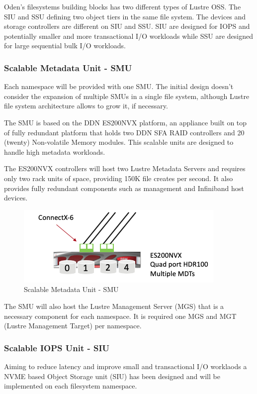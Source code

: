 \documentclass{article}
\begin{document}
Oden's filesystems building blocks has two different types of Lustre OSS. The SIU and SSU defining two object tiers in the same file system. The devices and storage controllers are different on SIU and SSU. SIU are designed for IOPS and potentially smaller and more transactional I/O workloads while SSU are designed for large sequential bulk I/O workloads.

\subsubsection{Scalable Metadata Unit - SMU}
Each namespace will be provided with one SMU. The initial design doesn't consider the expansion of multiple SMUs in a single file system, although Lustre file system architecture allows to grow it, if necessary. 

The SMU is based on the DDN ES200NVX platform, an appliance built on top of fully redundant platform that holds two DDN SFA RAID controllers and 20 (twenty) Non-volatile Memory modules. This scalable units are designed to handle high metadata workloads. 

The ES200NVX controllers will host two Lustre Metadata Servers and requires only two rack units of space, providing 150K file creates per second. It also provides fully redundant components such as management and Infiniband host devices.

\begin{figure}
    \centering
    \includegraphics[scale=0.60]{SMU.png}
    \caption{Scalable Metadata Unit - SMU}
    \label{fig:smu}
\end{figure}

The SMU will also host the Lustre Management Server (MGS) that is a necessary component for each namespace. It is required one MGS and MGT (Lustre Management Target) per namespace.

\subsubsection{Scalable IOPS Unit - SIU}
Aiming to reduce latency and improve small and transactional I/O worklaods a NVME based Object Storage unit (SIU) has been designed and will be implemented on each filesystem namespace. 
\end{document}
